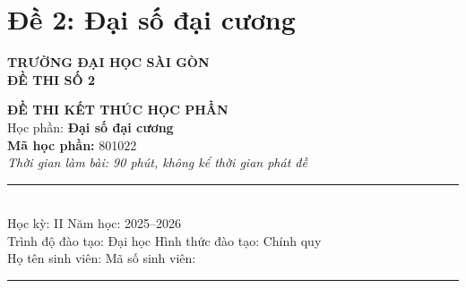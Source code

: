 
\section*{Đề 2: Đại số đại cương}

\noindent
\begin{minipage}[t]{0.45\textwidth}
    \begin{center}
        \textbf{TRƯỜNG ĐẠI HỌC SÀI GÒN}\\[0.3cm]
        \textbf{ĐỀ THI SỐ 2}
    \end{center}
\end{minipage}
\hfill
\begin{minipage}[t]{0.5\textwidth}
    \begin{center}
        \textbf{ĐỀ THI KẾT THÚC HỌC PHẦN}\\[0.2cm]
        Học phần: \textbf{Đại số đại cương}\\
        \textbf{Mã học phần:} 801022\\[0.2cm]
        \textit{Thời gian làm bài: 90 phút, không kể thời gian phát đề}
    \end{center}
\end{minipage}

\vspace{0.8cm}

\noindent
\rule{\textwidth}{0.5pt}\\[0.2cm]
Học kỳ: II \dotfill Năm học: 2025--2026 \dotfill\\[0.2cm]
Trình độ đào tạo: Đại học \dotfill Hình thức đào tạo: Chính quy \dotfill\\[0.2cm]
Họ tên sinh viên: \dotfill Mã số sinh viên: \dotfill\\[0.2cm]
\rule{\textwidth}{0.5pt}

\vspace{0.8cm}

\begin{center}
\end{center}

